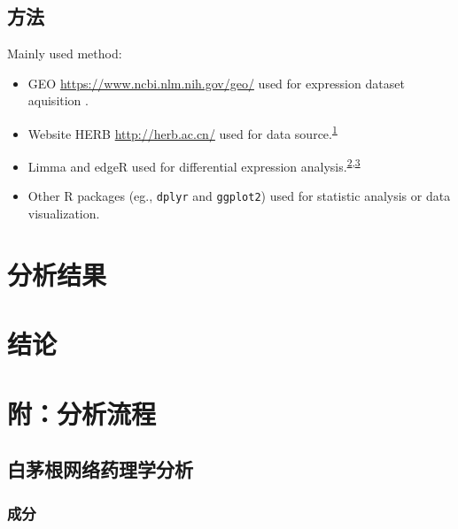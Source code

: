 \documentclass[
]{article}
\providecommand{\tightlist}{%
  \setlength{\itemsep}{0pt}\setlength{\parskip}{0pt}}
\begin{document}
\hypertarget{ux65b9ux6cd5}{%
\subsection{方法}\label{ux65b9ux6cd5}}

Mainly used method:

\begin{itemize}
\tightlist
\item
  GEO \url{https://www.ncbi.nlm.nih.gov/geo/} used for expression dataset aquisition .
\item
  Website HERB \url{http://herb.ac.cn/} used for data source.\textsuperscript{\protect\hyperlink{ref-HerbAHighThFang2021}{1}}
\item
  Limma and edgeR used for differential expression analysis.\textsuperscript{\protect\hyperlink{ref-LimmaPowersDiRitchi2015}{2},\protect\hyperlink{ref-EdgerDifferenChen}{3}}
\item
  Other R packages (eg., \texttt{dplyr} and \texttt{ggplot2}) used for statistic analysis or data visualization.
\end{itemize}

\hypertarget{results}{%
\section{分析结果}\label{results}}

\hypertarget{dis}{%
\section{结论}\label{dis}}

\hypertarget{workflow}{%
\section{附：分析流程}\label{workflow}}

\hypertarget{ux767dux8305ux6839ux7f51ux7edcux836fux7406ux5b66ux5206ux6790}{%
\subsection{白茅根网络药理学分析}\label{ux767dux8305ux6839ux7f51ux7edcux836fux7406ux5b66ux5206ux6790}}

\hypertarget{ux6210ux5206}{%
\subsubsection{成分}\label{ux6210ux5206}}
\end{document}
